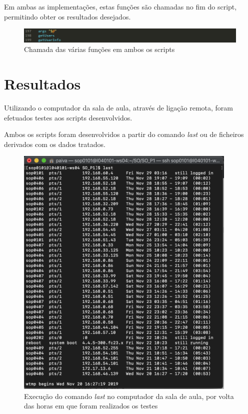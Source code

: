 \documentclass[10pt,portuguese]{article}
\begin{document}
\clearpage
Em ambas as implementações, estas funções são chamadas no fim do script, permitindo obter os resultados desejados.
\begin{figure}[!h]
    \centering
    \includegraphics[width=\textwidth]{function_call.png}
    \caption{Chamada das várias funções em ambos os scripts}
\end{figure}
\clearpage
\section{Resultados}
\par Utilizando o computador da sala de aula, através de ligação remota, foram efetuados testes aos scripts desenvolvidos.
\par Ambos os scripts foram desenvolvidos a partir do comando \textit{last} ou de ficheiros derivados com os dados tratados.
\begin{figure}[!h]
    \centering
    \includegraphics[width=400]{Resultados/last.png}
    \caption{Execução do comando \textit{last} no computador da sala de aula, por volta das horas em que foram realizados os testes}
\end{figure}
\clearpage
\end{document}
